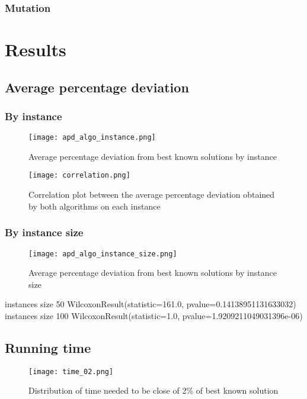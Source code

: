 \documentclass[a4paper,10pt]{article}
\begin{document}
		\subsubsection{Mutation}

\section{Results}

	\subsection{Average percentage deviation}

		\subsubsection{By instance}

		\begin{figure}[H]
			\centering
			\caption{Average percentage deviation from best known solutions by instance}
			\texttt{[image: apd\_algo\_instance.png]}
		\end{figure}


		\begin{figure}[H]
			\centering
			\caption{Correlation plot between the average percentage deviation obtained by both algorithms on each instance}
			\texttt{[image: correlation.png]}
		\end{figure}


		\subsubsection{By instance size}

		\begin{figure}[H]
			\centering
			\caption{Average percentage deviation from best known solutions by instance size}
			\texttt{[image: apd\_algo\_instance\_size.png]}
		\end{figure}

		instances size 50
		WilcoxonResult(statistic=161.0, pvalue=0.14138951131633032)
		instances size 100
		WilcoxonResult(statistic=1.0, pvalue=1.9209211049031396e-06)

	\subsection{Running time}

	\begin{figure}[H]
		\centering
		\caption{Distribution of time needed to be close of 2\% of best known solution}
		\texttt{[image: time\_02.png]}
	\end{figure}
\end{document}
